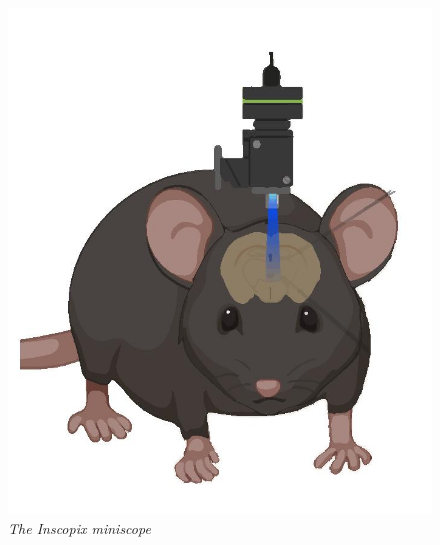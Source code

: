 \documentclass[12pt, a4paper]{report}
\begin{document}
\begin{figure}[H]
	\begin{center}
		\includegraphics[scale=.35]{Inscopix.jpg} 
	\end{center} 
	\caption{\textit{The Inscopix miniscope}}
	
\end{figure}
\end{document}
